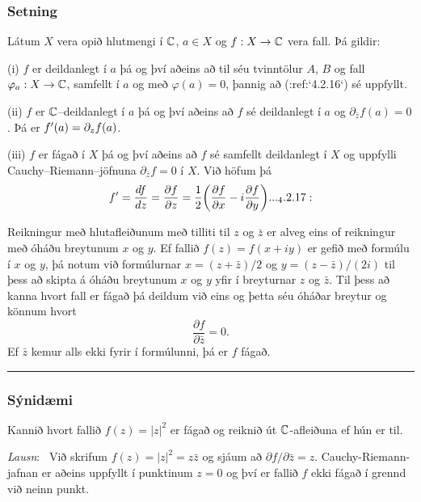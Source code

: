 \subsubsection{Setning}  Látum $X$ vera opið hlutmengi í ${\mathbb C}$, $a\in X$ og $f:X\to {\mathbb C}$ vera
fall.  Þá gildir:

\smallskip\noindent
(i) $f$ er deildanlegt í $a$ þá og því aðeins að til séu tvinntölur $A$,
$B$ og fall $\varphi_a:X\to {\mathbb C}$, samfellt í $a$ og með
$\varphi(a)=0$, þannig að (:ref:`4.2.16`) sé uppfyllt.

\smallskip\noindent
(ii) $f$ er ${\mathbb C}$--deildanlegt í $a$ þá og því aðeins að $f$ sé
deildanlegt í $a$ og ${\partial}_{\bar z}f(a)=0$.  Þá er
$f{\sp{\prime}}(a)={\partial}_zf(a)$.

\smallskip\noindent
(iii) $f$ er fágað í $X$ þá og því aðeins að $f$ sé samfellt deildanlegt
í $X$ og uppfylli Cauchy--Riemann--jöfnuna ${\partial}_{\bar z}f=0$ í
$X$. Við höfum þá
\begin{equation*}
f\dash=\dfrac{df}{dz}=\dfrac{\partial f}{\partial z}=\dfrac 12\bigg(
\dfrac{\partial f}{\partial x}-i\dfrac{\partial f}{\partial y}\bigg).


.. _4.2.17:

\end{equation*}




Reikningur með hlutafleiðunum með tilliti til $z$ og $\bar z$ er alveg
eins of reikningur með óháðu breytunum $x$ og $y$.  Ef fallið 
$f(z)=f(x+iy)$ er gefið með formúlu í $x$ og $y$, þá notum við
formúlurnar $x=(z+\bar z)/2$ og $y=(z-\bar z)/(2i)$ til þess að skipta
á óháðu breytunum $x$ og $y$ yfir í breyturnar $z$ og $\bar z$.  Til
þess að kanna hvort fall er fágað þá deildum við eins og þetta séu
óháðar breytur og könnum hvort 
$$
\dfrac{\partial f}{\partial\bar z}=0.
$$
Ef $\bar z$ kemur alls ekki fyrir í formúlunni, þá er $f$ fágað.

 
\bigskip\hrule\bigskip

\subsubsection{Sýnidæmi}  Kannið hvort fallið $f(z)= |z|^2$ er fágað og reiknið út
${\mathbb C}$-afleiðuna ef hún er til.  

\smallskip\noindent
{\it Lausn}: \  Við skrifum  $f(z)=|z|^2=z\bar z$ og
sjáum að  ${\partial}f/{\partial}\bar z=z$.  Cauchy-Riemann-jafnan er aðeins
uppfyllt í punktinum $z=0$ og því er fallið $f$ ekki fágað í grennd við
neinn punkt.


